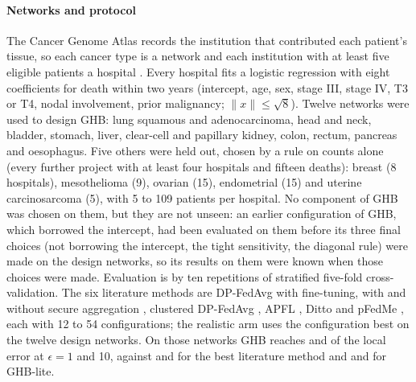 \paragraph{Networks and protocol} The Cancer Genome Atlas records the institution that contributed each patient's tissue, so each cancer type is a network and each institution with at least five eligible patients a hospital \cite{grossman2016toward,weinstein2013cancer}. Every hospital fits a logistic regression with eight coefficients for death within two years (intercept, age, sex, stage III, stage IV, T3 or T4, nodal involvement, prior malignancy; $\|x\|\le\sqrt8$). Twelve networks were used to design GHB: lung squamous and adenocarcinoma, head and neck, bladder, stomach, liver, clear-cell and papillary kidney, colon, rectum, pancreas and oesophagus. Five others were held out, chosen by a rule on counts alone (every further project with at least four hospitals and fifteen deaths): breast (8 hospitals), mesothelioma (9), ovarian (15), endometrial (15) and uterine carcinosarcoma (5), with 5 to 109 patients per hospital. No component of GHB was chosen on them, but they are not unseen: an earlier configuration of GHB, which borrowed the intercept, had been evaluated on them before its three final choices (not borrowing the intercept, the tight sensitivity, the diagonal rule) were made on the design networks, so its results on them were known when those choices were made. Evaluation is by ten repetitions of stratified five-fold cross-validation. The six literature methods are DP-FedAvg \cite{mcmahan2018learning} with fine-tuning, with and without secure aggregation \cite{bonawitz2017practical}, clustered DP-FedAvg \cite{ghosh2020efficient}, APFL \cite{deng2020adaptive}, Ditto \cite{li2021ditto} and pFedMe \cite{tdinh2020personalized}, each with 12 to 54 configurations; the realistic arm uses the configuration best on the twelve design networks. On those networks GHB reaches \SimTDOneGHB{} and \SimTDTenGHB{} of the local error at $\epsilon=1$ and 10, against \SimTDOneBestLit{} and \SimTDTenBestLit{} for the best literature method and \SimTDOneLite{} and \SimTDTenLite{} for GHB-lite.


